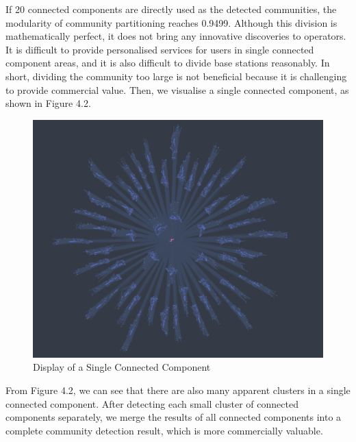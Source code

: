 \documentclass[ %
                    author={Tengyao Tu},
                supervisor={Dr. James Pope},
                    degree={MSc},
                     title={A New Perspective on Graph Community Detection: Combining Traditional Methods with Deep Learning Approaches},
                  subtitle={Applying to Telecom Networks and Diverse Datasets},
                      type={},
                      year={2024}]{dissertation}
\begin{document}
If 20 connected components are directly used as the detected communities, the modularity of community partitioning reaches 0.9499. Although this division is mathematically perfect, it does not bring any innovative discoveries to operators. It is difficult to provide personalised services for users in single connected component areas, and it is also difficult to divide base stations reasonably. In short, dividing the community too large is not beneficial because it is challenging to provide commercial value. Then, we visualise a single connected component, as shown in Figure 4.2.
\begin{figure}[h!] %
    \centering
    \includegraphics[width=1.0\textwidth]{Figure_6.png} %
    \caption{Display of a Single Connected Component}
    \label{virtual Graph Data Map}
\end{figure}
From Figure 4.2, we can see that there are also many apparent clusters in a single connected component. After detecting each small cluster of connected components separately, we merge the results of all connected components into a complete community detection result, which is more commercially valuable.
\end{document}
